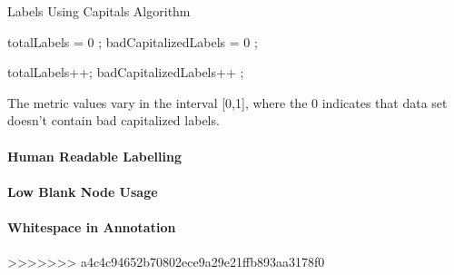 \begin{algorithm}
\caption{Labels Using Capitals Algorithm}\label{lst:badCapitals}
\begin{algorithmic}[1]
\State totalLabels = 0 ;
\State badCapitalizedLabels = 0 ;
\EndProcedure

 totalLabels++; \EndIf
{}badCapitalizedLabels++ ; \EndIf
{}
\EndProcedure
\end{algorithmic}
\end{algorithm}


The metric values vary in the interval [0,1], where  the 0 indicates that data set doesn't contain bad capitalized labels.

\paragraph{Human Readable Labelling}


\paragraph{Low Blank Node Usage}









\paragraph{Whitespace in Annotation}
>>>>>>> a4c4c94652b70802ece9a29e21ffb893aa3178f0
